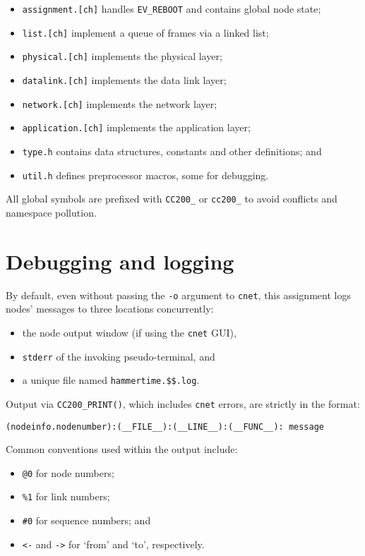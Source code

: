 \documentclass[a4paper,12pt,titlepage]{article}
\begin{document}
\begin{itemize}
	\item \texttt{assignment.[ch]} handles \texttt{EV\_REBOOT} and contains
	      global node state;
	\item \texttt{list.[ch]} implement a queue of frames via a linked list;
	\item \texttt{physical.[ch]} implements the physical layer;
	\item \texttt{datalink.[ch]} implements the data link layer;
	\item \texttt{network.[ch]} implements the network layer;
	\item \texttt{application.[ch]} implements the application layer;
	\item \texttt{type.h} contains data structures, constants and other
	      definitions; and
	\item \texttt{util.h} defines preprocessor macros, some for debugging.
\end{itemize}

All global symbols are prefixed with \texttt{CC200\_} or \texttt{cc200\_} to
avoid conflicts and namespace pollution.

\section{Debugging and logging}

By default, even without passing the \texttt{-o} argument to \texttt{cnet},
this assignment logs nodes' messages to three locations concurrently:

\begin{itemize}
	\item the node output window (if using the \texttt{cnet} GUI),
	\item \texttt{stderr} of the invoking pseudo-terminal, and
	\item a unique file named \texttt{hammertime.\$\$.log}.
\end{itemize}

Output via \texttt{CC200\_PRINT()}, which includes \texttt{cnet} errors, are
strictly in the format:

\begin{lstlisting}
(nodeinfo.nodenumber):(__FILE__):(__LINE__):(__FUNC__): message
\end{lstlisting}

Common conventions used within the output include:

\begin{itemize}
	\item \texttt{@0} for node numbers;
	\item \texttt{\%1} for link numbers;
	\item \texttt{\#0} for sequence numbers; and
	\item \texttt{<-} and \texttt{->} for `from' and `to', respectively.
\end{itemize}
\end{document}
